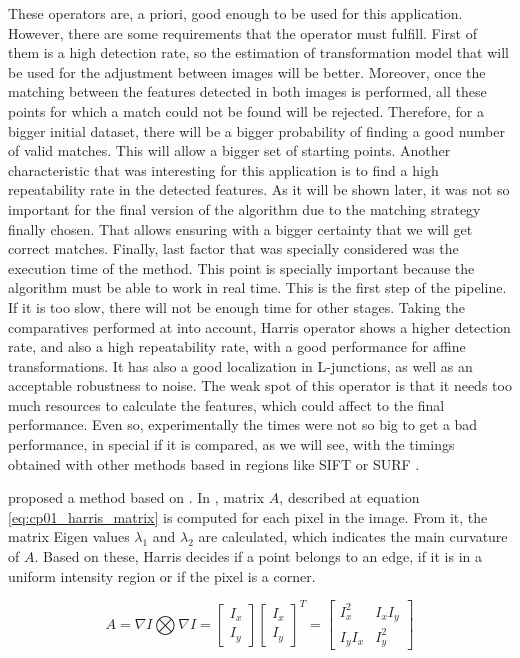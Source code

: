 These operators are, a priori, good enough to be used for this application. However, there are some requirements that the operator must fulfill. First of them is a high detection rate, so the estimation of transformation model that will be used for the adjustment between images will be better. Moreover, once the matching between the features detected in both images is performed, all these points for which a match could not be found will be rejected. Therefore, for a bigger initial dataset, there will be a bigger probability of finding a good number of valid matches. This will allow a bigger set of starting points. Another characteristic that was interesting for this application is to find a high repeatability rate in the detected features. As it will be shown later, it was not so important for the final version of the algorithm due to the matching strategy finally chosen. That allows ensuring with a bigger certainty that we will get correct matches. Finally, last factor that was specially considered was the execution time of the method. This point is specially important because the algorithm must be able to work in real time. This is the first step of the pipeline. If it is too slow, there will not be enough time for other stages. Taking the comparatives performed at \cite{mohanna2001performance, zheng1999analysis} into account, Harris operator shows a higher detection rate, and also a high repeatability rate, with a good performance for affine transformations. It has also a good localization in L-junctions, as well as an acceptable robustness to noise. The weak spot of this operator is that it needs too much resources to calculate the features, which could affect to the final performance. Even so, experimentally the times were not so big to get a bad performance, in special if it is compared, as we will see, with the timings obtained with other methods based in regions like SIFT \citep{lowe1999object} or SURF \citep{bay2008speeded}.

\cite{shi1994good} proposed a method based on \cite{harris1988combined}. In \cite{harris1988combined}, matrix $A$, described at equation \ref{eq:cp01_harris_matrix} is computed for each pixel in the image. From it, the matrix Eigen values $\lambda_1$ and $\lambda_2$ are calculated, which indicates the main curvature of $A$. Based on these, Harris decides if a point belongs to an edge, if it is in a uniform intensity region or if the pixel is a corner.

\begin{equation}\label{eq:cp01_harris_matrix}
A = \nabla I \bigotimes \nabla I = 
\left [ \begin{array}{c} I_x \\ I_y \end{array} \right ]
\left [ \begin{array}{c} I_x \\ I_y \end{array} \right ]^T = 
\left [ \begin{array}{cc} 
I_x^2 & I_xI_y \\ 
I_yI_x & I_y^2
\end{array} \right ]
\end{equation}

